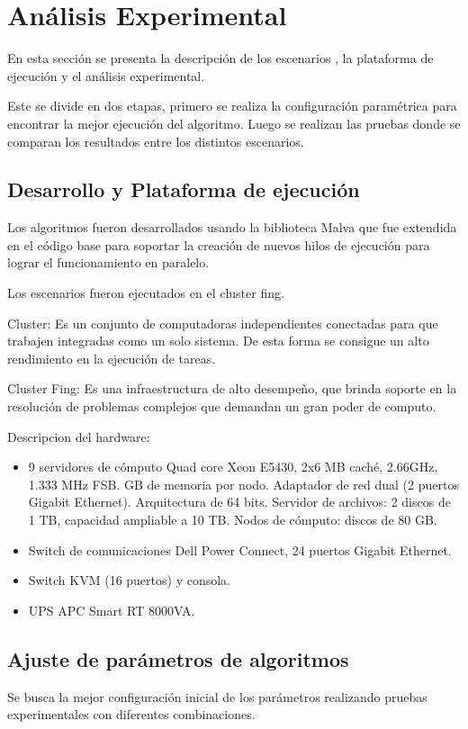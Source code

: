 \chapter{Análisis Experimental}
En esta sección se presenta la descripción de los escenarios , la plataforma de ejecución y el análisis experimental.

Este se divide en dos etapas, primero se realiza la configuración paramétrica para encontrar la mejor ejecución del algoritmo. Luego se realizan las pruebas donde se comparan los resultados entre los distintos escenarios.


\section{Desarrollo y Plataforma de ejecución }
Los algoritmos fueron desarrollados usando la biblioteca Malva que fue extendida en el código base para soportar la creación de nuevos hilos de ejecución para lograr el funcionamiento en paralelo.

Los escenarios fueron ejecutados en el cluster fing.

Cluster: Es un conjunto de computadoras independientes conectadas para que trabajen integradas como un solo sistema. De esta forma se consigue un alto rendimiento en la ejecución de tareas. 

Cluster Fing: Es una infraestructura de alto desempeño, que brinda soporte en la resolución de problemas complejos que demandan un gran poder de computo.

Descripcion del hardware: 
\begin{itemize}
	\item 9 servidores de cómputo
	\subitem Quad core Xeon E5430, 2x6 MB caché, 2.66GHz, 1.333 MHz FSB.
	 GB de memoria por nodo.
	\subitem Adaptador de red dual (2 puertos Gigabit Ethernet).
	\subitem  Arquitectura de 64 bits.
	\subitem Servidor de archivos: 2 discos de 1 TB, capacidad ampliable a 10 TB.
	\subitem Nodos de cómputo: discos de 80 GB.
	\item Switch de comunicaciones
	\subitem Dell Power Connect, 24 puertos Gigabit Ethernet.
	\item Switch KVM (16 puertos) y consola.
	\item UPS APC Smart RT 8000VA.
\end{itemize}

\section{Ajuste de parámetros de algoritmos}
Se busca la mejor configuración inicial de los parámetros realizando pruebas experimentales con diferentes combinaciones.  

